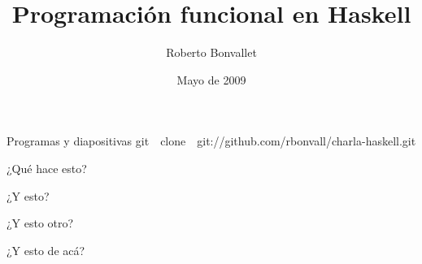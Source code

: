 \documentclass[12pt]{beamer}
\title {Programación funcional en Haskell}
\author{Roberto Bonvallet}
\institute[]{
    Departamento de Informática \\
    Universidad Técnica Federico Santa María
}
\date{Mayo de 2009}
\begin{document}
\begin{frame}
    \titlepage
\end{frame}

\begin{frame}
    \begin{block}{Programas y diapositivas}
        git~~clone~~git:/\!\!/github.com/rbonvall/charla-haskell.git
    \end{block}
\end{frame}
    
%    
%
%    
%
%    


\begin{frame}[fragile]
    \begin{block}{¿Qué hace esto?}
        
    \end{block}
    \pause
    \begin{block}{¿Y esto?}
        
    \end{block}
\end{frame}

\begin{frame}[fragile]
    \begin{block}{¿Y esto otro?}
        
    \end{block}
    \pause
    \begin{block}{¿Y esto de ac\'a?}
        
    \end{block}
\end{frame}
\end{document}
